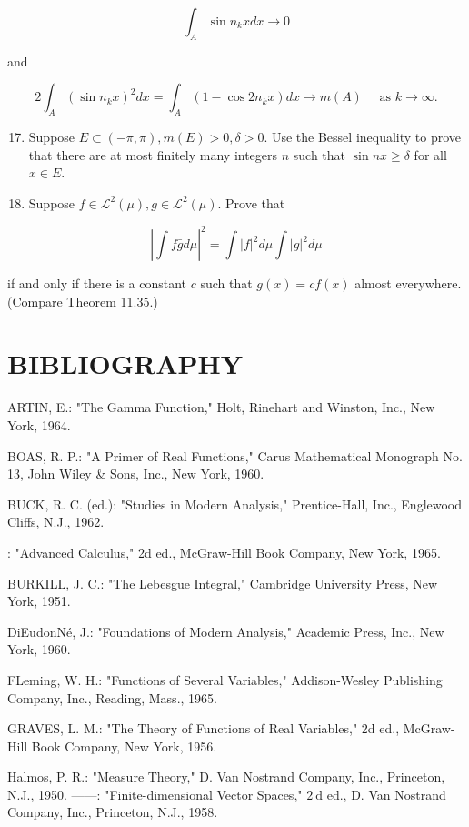\documentclass[10pt]{article}
\begin{document}
$$
\int_{A} \sin n_{k} x d x \rightarrow 0
$$

and

$$
2 \int_{A}\left(\sin n_{k} x\right)^{2} d x=\int_{A}\left(1-\cos 2 n_{k} x\right) d x \rightarrow m(A) \quad \text { as } k \rightarrow \infty .
$$

\begin{enumerate}
  \setcounter{enumi}{16}
  \item Suppose $E \subset(-\pi, \pi), m(E)>0, \delta>0$. Use the Bessel inequality to prove that there are at most finitely many integers $n$ such that $\sin n x \geq \delta$ for all $x \in E$.

  \item Suppose $f \in \mathscr{L}^{2}(\mu), g \in \mathscr{L}^{2}(\mu)$. Prove that

\end{enumerate}

$$
\left|\int f \bar{g} d \mu\right|^{2}=\int|f|^{2} d \mu \int|g|^{2} d \mu
$$

if and only if there is a constant $c$ such that $g(x)=c f(x)$ almost everywhere. (Compare Theorem 11.35.)

\section{BIBLIOGRAPHY}
ARTIN, E.: "The Gamma Function," Holt, Rinehart and Winston, Inc., New York, 1964.

BOAS, R. P.: "A Primer of Real Functions," Carus Mathematical Monograph No. 13, John Wiley \& Sons, Inc., New York, 1960.

BUCK, R. C. (ed.): "Studies in Modern Analysis," Prentice-Hall, Inc., Englewood Cliffs, N.J., 1962.

: "Advanced Calculus," 2d ed., McGraw-Hill Book Company, New York, 1965.

BURKILL, J. C.: "The Lebesgue Integral," Cambridge University Press, New York, 1951.

DiEudonNé, J.: "Foundations of Modern Analysis," Academic Press, Inc., New York, 1960.

FLeming, W. H.: "Functions of Several Variables," Addison-Wesley Publishing Company, Inc., Reading, Mass., 1965.

GRAVES, L. M.: "The Theory of Functions of Real Variables," 2d ed., McGraw-Hill Book Company, New York, 1956.

Halmos, P. R.: "Measure Theory," D. Van Nostrand Company, Inc., Princeton, N.J., 1950. ——: "Finite-dimensional Vector Spaces," $2 \mathrm{~d}$ ed., D. Van Nostrand Company, Inc., Princeton, N.J., 1958.
\end{document}
